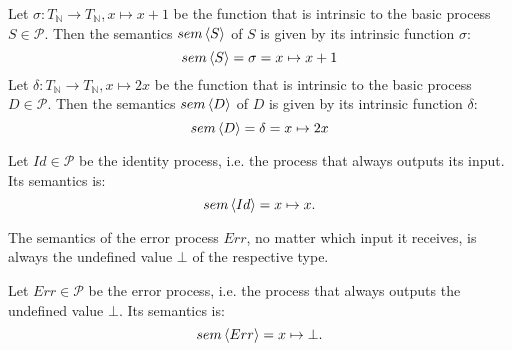 \begin{example}
  \label{exp:sem_atomic}
  Let $\sigma \colon T_\mathbb{N} \to T_\mathbb{N}, x \mapsto x+1$ be the function that is intrinsic to the basic process $S \in \mathcal{P}$. Then the semantics $sem \left\langle S \right\rangle$ of $S$ is given by its intrinsic function $\sigma$:
  \begin{equation*}
    sem \left\langle S \right\rangle = \sigma = x \mapsto x+1
  \end{equation*}
  Let $\delta \colon T_\mathbb{N} \to T_\mathbb{N}, x \mapsto 2x$ be the function that is intrinsic to the basic process $D \in \mathcal{P}$. Then the semantics $sem \left\langle D \right\rangle$ of $D$ is given by its intrinsic function $\delta$:
  \begin{equation*}
    sem \left\langle D \right\rangle = \delta = x \mapsto 2x
  \end{equation*}
\end{example}

\begin{definition}
\label{def:sem_id}
Let $Id \in \mathcal{P}$ be the identity process, i.e. the process that always outputs its input. Its semantics is:
\begin{equation*}
  \label{eqn:sem_id}
  sem \left\langle Id \right\rangle = x \mapsto x.
\end{equation*}
  \vspace*{-0.5em}
  \hfill\qedsymbol
\end{definition}


The semantics of the error process $Err$, no matter which input it receives, is always the undefined value $\bot$ of the respective type. 
\begin{definition}
\label{def:sem_err}
Let $Err \in \mathcal{P}$ be the error process, i.e. the process that always outputs the undefined value $\bot$. Its semantics is:
  \begin{equation*}
    \label{eqn:sem_error}
    sem \left\langle Err \right\rangle = x \mapsto \bot.
  \end{equation*}
  \vspace*{-0.5em}
  \hfill\qedsymbol
\end{definition}

